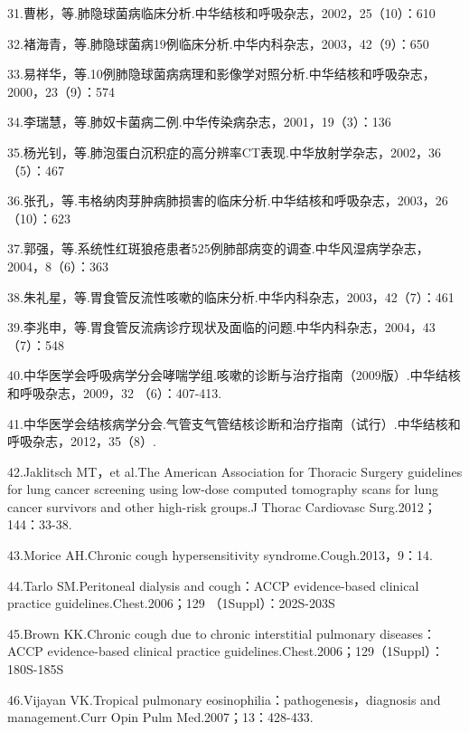 31.曹彬，等.肺隐球菌病临床分析.中华结核和呼吸杂志，2002，25（10）：610

32.褚海青，等.肺隐球菌病19例临床分析.中华内科杂志，2003，42（9）：650

33.易祥华，等.10例肺隐球菌病病理和影像学对照分析.中华结核和呼吸杂志，2000，23（9）：574

34.李瑞慧，等.肺奴卡菌病二例.中华传染病杂志，2001，19（3）：136

35.杨光钊，等.肺泡蛋白沉积症的高分辨率CT表现.中华放射学杂志，2002，36（5）：467

36.张孔，等.韦格纳肉芽肿病肺损害的临床分析.中华结核和呼吸杂志，2003，26（10）：623

37.郭强，等.系统性红斑狼疮患者525例肺部病变的调查.中华风湿病学杂志，2004，8（6）：363

38.朱礼星，等.胃食管反流性咳嗽的临床分析.中华内科杂志，2003，42（7）：461

39.李兆申，等.胃食管反流病诊疗现状及面临的问题.中华内科杂志，2004，43（7）：548

40.中华医学会呼吸病学分会哮喘学组.咳嗽的诊断与治疗指南（2009版）.中华结核和呼吸杂志，2009，32
（6）：407-413.

41.中华医学会结核病学分会.气管支气管结核诊断和治疗指南（试行）.中华结核和呼吸杂志，2012，35（8）.

42.Jaklitsch MT，et al.The American Association for Thoracic Surgery
guidelines for lung cancer screening using low-dose computed tomography
scans for lung cancer survivors and other high-risk groups.J Thorac
Cardiovasc Surg.2012；144：33-38.

43.Morice AH.Chronic cough hypersensitivity syndrome.Cough.2013，9：14.

44.Tarlo SM.Peritoneal dialysis and cough：ACCP evidence-based clinical
practice guidelines.Chest.2006；129 （1Suppl）：202S-203S

45.Brown KK.Chronic cough due to chronic interstitial pulmonary
diseases：ACCP evidence-based clinical practice
guidelines.Chest.2006；129（1Suppl）：180S-185S

46.Vijayan VK.Tropical pulmonary eosinophilia：pathogenesis，diagnosis
and management.Curr Opin Pulm Med.2007；13：428-433.

\protect\hypertarget{text00069.html}{}{}

